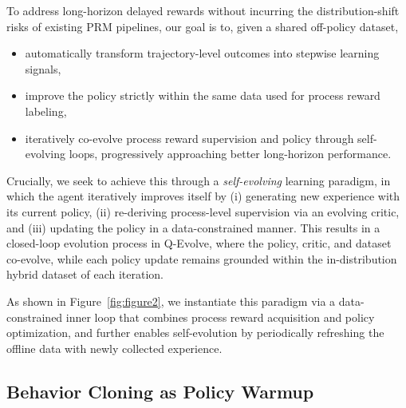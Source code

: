 \documentclass{article}
\theoremstyle{plain}
\theoremstyle{definition}
\theoremstyle{remark}
\begin{document}
To address long-horizon delayed rewards without incurring the distribution-shift risks of existing PRM pipelines, our goal is to, given a shared off-policy dataset,
\begin{itemize}[nosep, leftmargin=1em]
    \item automatically transform trajectory-level outcomes into stepwise learning signals,
    \item improve the policy strictly within the same data used for process reward labeling,
    \item  iteratively co-evolve process reward supervision and policy through self-evolving loops, progressively approaching better long-horizon performance.
    
\end{itemize}

Crucially, we seek to achieve this through a \emph{self-evolving} learning paradigm, in which the agent iteratively improves itself by (i) generating new experience with its current policy, (ii) re-deriving process-level supervision via an evolving critic, and (iii) updating the policy in a data-constrained manner.
This results in a closed-loop evolution process in Q-Evolve, where the policy, critic, and dataset co-evolve, while each policy update remains grounded within the in-distribution hybrid dataset of each iteration.

As shown in Figure~\ref{fig:figure2}, we instantiate this paradigm via a data-constrained inner loop that combines process reward acquisition and policy optimization, and further enables self-evolution by periodically refreshing the offline data with newly collected experience.

\subsection{Behavior Cloning as Policy Warmup}
\end{document}
